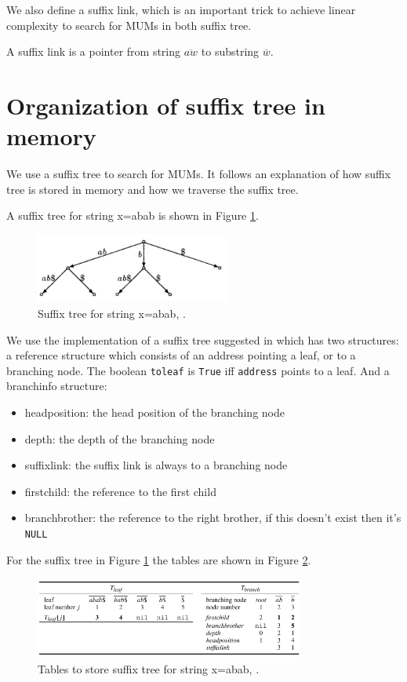 \documentclass[conference]{IEEEtran}
\begin{document}
We also define a suffix link, which is an important trick to achieve linear complexity to search for MUMs in both suffix tree.
\begin{mydef}
A suffix link is a pointer from string $\overline{aw}$ to substring $\overline{w}$.
\end{mydef}

\section{Organization of suffix tree in memory}
We use a suffix tree to search for MUMs. It follows an explanation of how suffix tree is stored in memory and how we traverse the suffix tree.

A suffix tree for string x=abab is shown in Figure \ref{suftree}.  
\begin{figure}[!t]
\centering
\includegraphics[width=2.5in]{st.png}
\caption{Suffix tree for string x=abab, \cite{Kurtz1999}.}
\label{suftree}
\end{figure}

We use the implementation of a suffix tree suggested in \cite{Kurtz1999} which has two structures: a reference structure which consists of an address pointing a leaf, or to a branching node. The boolean \texttt{toleaf} is \texttt{True} iff \texttt{address} points to a leaf. And a branchinfo structure:
\begin{itemize}
  \item headposition: the head position of the branching node
   \item    depth: the depth of the branching node
  \item suffixlink: the suffix link is always to a branching node
  \item firstchild: the reference to the first child
  \item          branchbrother: the reference to the right brother, if this doesn't exist then it's \texttt{NULL}
\end{itemize}

                             For the suffix tree in Figure \ref{suftree} the tables are shown in Figure \ref{tables}. 
\begin{figure}[!t]
\centering
\includegraphics[width=3.5in]{tables.png}
\caption{Tables to store suffix tree for string x=abab, \cite{Kurtz1999}.}
\label{tables}
\end{figure}
\end{document}
